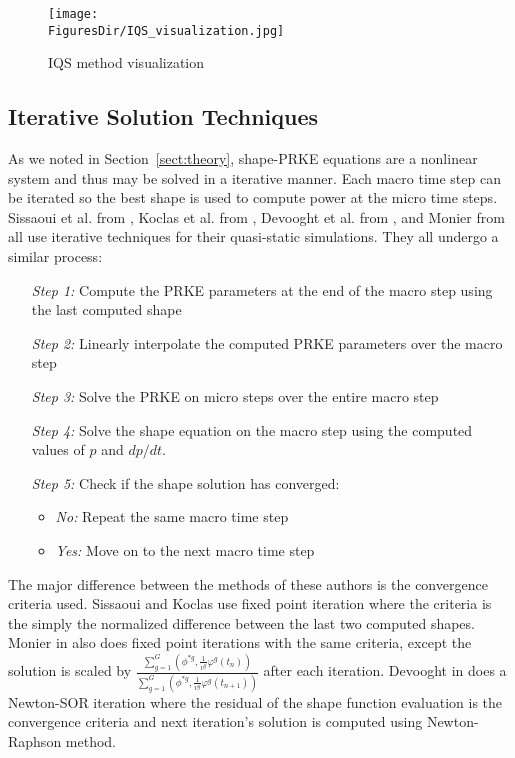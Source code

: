 \documentclass[12pt]{scrartcl}
\newcommand{\sct}[1]{Section~\ref{#1}}                   %
\newcommand{\FiguresDir}{./figs}
\begin{document}
\begin{figure}[!htbp]
\texttt{[image: \\FiguresDir/IQS\_visualization.jpg]}
\caption{IQS method visualization}
\label{fig:iqsviz}
\end{figure}


\subsection{Iterative Solution Techniques}
\label{sect:iter}

As we noted in \sct{sect:theory}, shape-PRKE equations are a nonlinear system and thus may be solved in a iterative manner.  Each macro time step can be iterated so the best shape is used to compute power at the micro time steps. Sissaoui et al. from \cite{Sissaoui_1995}, Koclas et al. from \cite{Koclas_1996}, Devooght et al. from \cite{Devooght_1984}, and Monier from \cite{Monier_diss} all use iterative techniques for their quasi-static simulations.  They all undergo a similar process:
\begin{itemize}
\item[\textit{Step 1:}] Compute the PRKE parameters at the end of the macro step using the last computed shape
\item[\textit{Step 2:}] Linearly interpolate the computed PRKE parameters over the macro step
\item[\textit{Step 3:}] Solve the PRKE on micro steps over the entire macro step
\item[\textit{Step 4:}] Solve the shape equation on the macro step using the computed values of $p$ and $dp/dt$.
\item[\textit{Step 5:}] Check if the shape solution has converged:
	\begin{itemize}
	\item \textit{No:} Repeat the same macro time step
	\item \textit{Yes:} Move on to the next macro time step
	\end{itemize}
\end{itemize}

The major difference between the methods of these authors is the convergence criteria used.  Sissaoui and Koclas \cite{Sissaoui_1995, Koclas_1996} use fixed point iteration where the criteria is the simply the normalized difference between the last two computed shapes.  Monier in \cite{Monier_diss} also does fixed point iterations with the same criteria, except the solution is scaled by $\frac{\sum_{g=1}^G\left(\phi^{*g},\frac{1}{v^g}\varphi^g(t_{n})\right)}{\sum_{g=1}^G\left(\phi^{*g},\frac{1}{v^g}\varphi^g(t_{n+1})\right)}$ after each iteration.  Devooght in \cite{Devooght_1984} does a Newton-SOR iteration where the residual of the shape function evaluation is the convergence criteria and next iteration's solution is computed using Newton-Raphson method.\\
\end{document}
